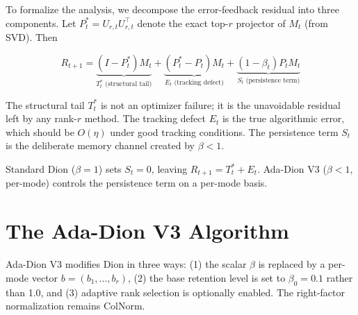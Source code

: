 \documentclass[11pt]{article}
\begin{document}
To formalize the analysis, we decompose the error-feedback residual into three components. Let $P_t^* = U_{r,t} U_{r,t}^\top$ denote the exact top-$r$ projector of $M_t$ (from SVD). Then

\begin{equation}
R_{t+1} = \underbrace{(I - P_t^*) M_t}_{T_t^* \text{ (structural tail)}} + \underbrace{(P_t^* - P_t) M_t}_{E_t \text{ (tracking defect)}} + \underbrace{(1-\beta_t) P_t M_t}_{S_t \text{ (persistence term)}}
\label{eq:residual_decomp}
\end{equation}

The structural tail $T_t^*$ is not an optimizer failure; it is the unavoidable residual left by any rank-$r$ method. The tracking defect $E_t$ is the true algorithmic error, which should be $O(\eta)$ under good tracking conditions. The persistence term $S_t$ is the deliberate memory channel created by $\beta < 1$.

Standard Dion ($\beta = 1$) sets $S_t = 0$, leaving $R_{t+1} = T_t^* + E_t$. Ada-Dion V3 ($\beta < 1$, per-mode) controls the persistence term on a per-mode basis.

\section{The Ada-Dion V3 Algorithm}
\label{sec:algorithm}

Ada-Dion V3 modifies Dion in three ways: (1) the scalar $\beta$ is replaced by a per-mode vector $b = (b_1, \ldots, b_r)$, (2) the base retention level is set to $\beta_0 = 0.1$ rather than 1.0, and (3) adaptive rank selection is optionally enabled. The right-factor normalization remains ColNorm.

\end{document}
